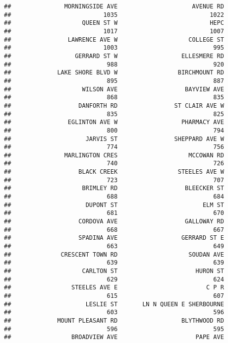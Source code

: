 \documentclass[]{article}
\begin{document}
\begin{verbatim}
##               MORNINGSIDE AVE                     AVENUE RD 
##                          1035                          1022 
##                    QUEEN ST W                          HEPC 
##                          1017                          1007 
##                LAWRENCE AVE W                    COLLEGE ST 
##                          1003                           995 
##                  GERRARD ST W                  ELLESMERE RD 
##                           988                           920 
##             LAKE SHORE BLVD W                 BIRCHMOUNT RD 
##                           895                           887 
##                    WILSON AVE                   BAYVIEW AVE 
##                           868                           835 
##                   DANFORTH RD                ST CLAIR AVE W 
##                           835                           825 
##                EGLINTON AVE W                  PHARMACY AVE 
##                           800                           794 
##                     JARVIS ST                SHEPPARD AVE W 
##                           774                           756 
##               MARLINGTON CRES                    MCCOWAN RD 
##                           740                           726 
##                   BLACK CREEK                 STEELES AVE W 
##                           723                           707 
##                    BRIMLEY RD                   BLEECKER ST 
##                           688                           684 
##                     DUPONT ST                        ELM ST 
##                           681                           670 
##                   CORDOVA AVE                   GALLOWAY RD 
##                           668                           667 
##                   SPADINA AVE                  GERRARD ST E 
##                           663                           649 
##              CRESCENT TOWN RD                    SOUDAN AVE 
##                           639                           639 
##                    CARLTON ST                      HURON ST 
##                           629                           624 
##                 STEELES AVE E                         C P R 
##                           615                           607 
##                     LESLIE ST       LN N QUEEN E SHERBOURNE 
##                           603                           596 
##             MOUNT PLEASANT RD                  BLYTHWOOD RD 
##                           596                           595 
##                 BROADVIEW AVE                      PAPE AVE 

\end{verbatim}
\end{document}
